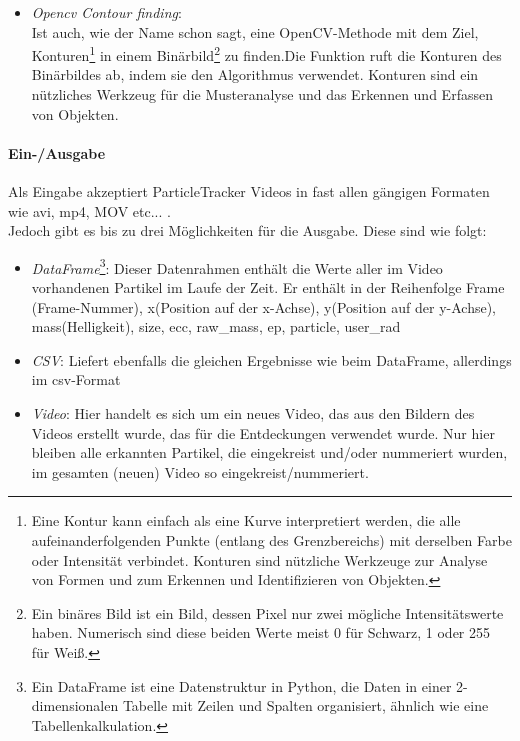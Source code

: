 \begin{itemize}
   \item \textit{Opencv Contour finding}:\\ Ist auch, wie der Name schon sagt, eine OpenCV-Methode mit dem Ziel, Konturen\footnote{Eine Kontur kann einfach als eine Kurve interpretiert werden, die alle aufeinanderfolgenden Punkte (entlang des Grenzbereichs) mit derselben Farbe oder Intensität verbindet. Konturen sind nützliche Werkzeuge zur Analyse von Formen und zum Erkennen und Identifizieren von Objekten.} in einem Binärbild\footnote{Ein binäres Bild ist ein Bild, dessen Pixel nur zwei mögliche Intensitätswerte haben. Numerisch sind diese beiden Werte meist 0 für Schwarz, 1 oder 255 für Weiß.} zu finden.Die Funktion ruft die Konturen des Binärbildes ab, indem sie den Algorithmus \cite{topological_contour_finding} verwendet. Konturen sind ein nützliches Werkzeug für die Musteranalyse und das Erkennen und Erfassen von Objekten.
\end{itemize}

    \paragraph{Ein-/Ausgabe}
Als Eingabe akzeptiert ParticleTracker Videos in fast allen gängigen Formaten wie avi, mp4, MOV etc... .\\

Jedoch gibt es bis zu drei Möglichkeiten für die Ausgabe. Diese sind wie folgt:
\begin{itemize}
\item \textit{DataFrame}\footnote{Ein DataFrame ist eine Datenstruktur in Python, die Daten in einer 2-dimensionalen Tabelle mit Zeilen und Spalten organisiert, ähnlich wie eine Tabellenkalkulation.}: Dieser Datenrahmen enthält die Werte aller im Video vorhandenen Partikel im Laufe der Zeit. Er enthält in der Reihenfolge Frame (Frame-Nummer), x(Position auf der x-Achse), y(Position auf der y-Achse), mass(Helligkeit), size, ecc, raw\_mass, ep, particle, user\_rad
\item \textit{CSV}: Liefert ebenfalls die gleichen Ergebnisse wie beim DataFrame, allerdings im csv-Format
\item \textit{Video}: Hier handelt es sich um ein neues Video, das aus den Bildern des Videos erstellt wurde, das für die Entdeckungen verwendet wurde. Nur hier bleiben alle erkannten Partikel, die eingekreist und/oder nummeriert wurden, im gesamten (neuen) Video so eingekreist/nummeriert.
\end{itemize}



